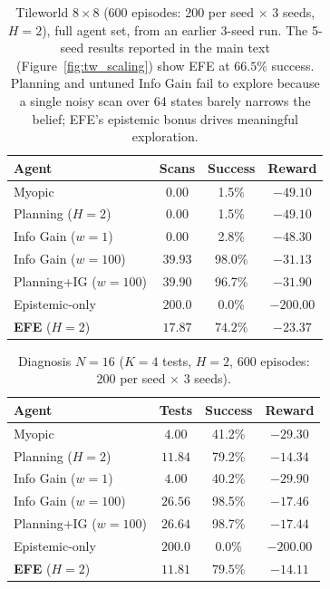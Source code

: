 \documentclass[runningheads]{llncs}
\begin{document}
\begin{table}[h]
\centering
\caption{Tileworld $8{\times}8$ (600 episodes: 200 per seed $\times$ 3 seeds, $H{=}2$), full agent set, from an earlier 3-seed run. The 5-seed results reported in the main text (Figure~\ref{fig:tw_scaling}) show EFE at $66.5\%$ success. Planning and untuned Info Gain fail to explore because a single noisy scan over 64 states barely narrows the belief; EFE's epistemic bonus drives meaningful exploration.}
\begin{small}
\begin{tabular}{lccc}
\toprule
Agent & Scans & Success & Reward \\
\midrule
Myopic & $0.00$ & 1.5\% & $-49.10$ \\
Planning ($H{=}2$) & $0.00$ & 1.5\% & $-49.10$ \\
Info Gain ($w{=}1$) & $0.00$ & 2.8\% & $-48.30$ \\
Info Gain ($w{=}100$) & $39.93$ & 98.0\% & $-31.13$ \\
Planning+IG ($w{=}100$) & $39.90$ & 96.7\% & $-31.90$ \\
Epistemic-only & $200.0$ & 0.0\% & $-200.00$ \\
\textbf{EFE} ($H{=}2$) & $\mathbf{17.87}$ & $\mathbf{74.2\%}$ & $\mathbf{-23.37}$ \\
\bottomrule
\end{tabular}
\end{small}
\end{table}

\begin{table}[h]
\centering
\caption{Diagnosis $N{=}16$ ($K{=}4$ tests, $H{=}2$, 600 episodes: 200 per seed $\times$ 3 seeds).}
\begin{small}
\begin{tabular}{lccc}
\toprule
Agent & Tests & Success & Reward \\
\midrule
Myopic & $4.00$ & 41.2\% & $-29.30$ \\
Planning ($H{=}2$) & $11.84$ & 79.2\% & $-14.34$ \\
Info Gain ($w{=}1$) & $4.00$ & 40.2\% & $-29.90$ \\
Info Gain ($w{=}100$) & $26.56$ & 98.5\% & $-17.46$ \\
Planning+IG ($w{=}100$) & $26.64$ & 98.7\% & $-17.44$ \\
Epistemic-only & $200.0$ & 0.0\% & $-200.00$ \\
\textbf{EFE} ($H{=}2$) & $\mathbf{11.81}$ & $\mathbf{79.5\%}$ & $\mathbf{-14.11}$ \\
\bottomrule
\end{tabular}
\end{small}
\end{table}
\end{document}
